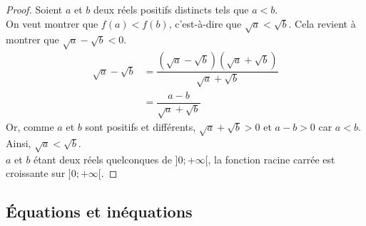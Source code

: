       
 \begin{proof}
 Soient $a$ et $b$ deux réels positifs distincts tels que $a< b$.\\
 On veut montrer que $f(a)<f(b)$, c'est-à-dire que $\sqrt{a}<\sqrt{b}$. Cela revient à montrer que $\sqrt{a}-\sqrt{b}<0$. \\
 \begin{align*}
 \sqrt{a}-\sqrt{b} &= \dfrac{(\sqrt{a}-\sqrt{b})(\sqrt{a}+\sqrt{b})}{\sqrt{a}+\sqrt{b}} \\
 &= \dfrac{a-b}{\sqrt{a}+\sqrt{b}}
 \end{align*}
 Or, comme $a$ et $b$ sont positifs et différents, $\sqrt{a}+\sqrt{b}>0$ et $a-b>0$ car $a<b$. \\
 Ainsi, $\sqrt{a}<\sqrt{b}$.\\
 $a$ et $b$ étant deux réels quelconques de $]0;+\infty[$, la fonction racine carrée est croissante sur $]0;+\infty[$.
 \end{proof}
 
 \newpage
 \subsection{Équations et inéquations}
 
